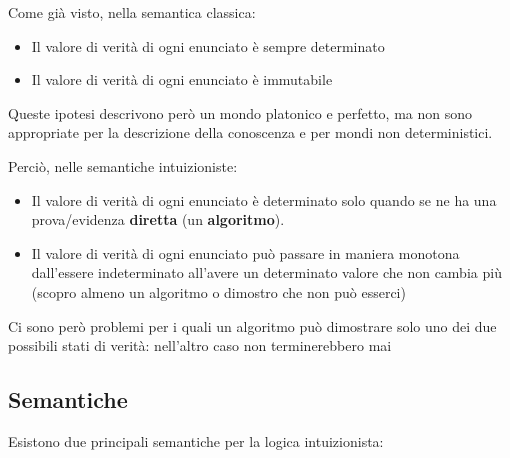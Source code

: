 \documentclass[
  a4paper,
]{article}
\providecommand{\tightlist}{%
  \setlength{\itemsep}{0pt}\setlength{\parskip}{0pt}}
\begin{document}
Come già visto, nella semantica classica:

\begin{itemize}
\tightlist
\item
  Il valore di verità di ogni enunciato è sempre determinato
\item
  Il valore di verità di ogni enunciato è immutabile
\end{itemize}

Queste ipotesi descrivono però un mondo platonico e perfetto, ma non
sono appropriate per la descrizione della conoscenza e per mondi non
deterministici.

Perciò, nelle semantiche intuizioniste:

\begin{itemize}
\tightlist
\item
  Il valore di verità di ogni enunciato è determinato solo quando se ne
  ha una prova/evidenza \textbf{diretta} (un \textbf{algoritmo}).
\item
  Il valore di verità di ogni enunciato può passare in maniera monotona
  dall'essere indeterminato all'avere un determinato valore che non
  cambia più (scopro almeno un algoritmo o dimostro che non può esserci)
\end{itemize}

Ci sono però problemi per i quali un algoritmo può dimostrare solo uno
dei due possibili stati di verità: nell'altro caso non terminerebbero
mai

\hypertarget{semantiche}{%
\subsection{Semantiche}\label{semantiche}}

Esistono due principali semantiche per la logica intuizionista:
\end{document}
